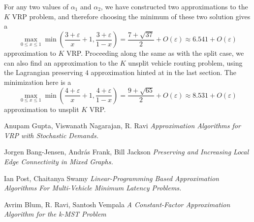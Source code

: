\documentclass{article}
\theoremstyle{plain}
\theoremstyle{plain}
\begin{document}
For any two values of $\alpha_1$ and $\alpha_2$, we have constructed two approximations to the $K$ VRP problem, and therefore choosing the minimum of these two solution gives a
%
\[ \max_{0 \leq x \leq 1} \min \left( \frac{3 + \varepsilon}{x} + 1, \frac{3 + \varepsilon}{1 - x} \right) = \frac{7 + \sqrt{37}}{2} + O(\varepsilon) \approx 6.541 + O(\varepsilon) \]
%
approximation to $K$ VRP. Proceeding along the same as with the split case, we can also find an approximation to the $K$ unsplit vehicle routing problem, using the Lagrangian preserving $4$ approximation hinted at in the last section. The minimization here is a
%
\[ \max_{0 \leq x \leq 1} \min \left( \frac{4 + \varepsilon}{x} + 1, \frac{4 + \varepsilon}{1 - x} \right) = \frac{9 + \sqrt{65}}{2} + O(\varepsilon) \approx 8.531 + O(\varepsilon) \]
%
approximation to unsplit $K$ VRP.

\begin{thebibliography}{9}

Anupam Gupta, Viswanath Nagarajan, R. Ravi
\textit{Approximation Algorithms for VRP with Stochastic Demands.}

Jorgen Bang-Jensen, Andr\'{a}s Frank, Bill Jackson
\textit{Preserving and Increasing Local Edge Connectivity in Mixed Graphs.}

Ian Post, Chaitanya Swamy
\textit{Linear-Programming Based Approximation Algorithms For Multi-Vehicle Minimum Latency Problems.}

Avrim Blum, R. Ravi, Santosh Vempala
\textit{A Constant-Factor Approximation Algorithm for the k-MST Problem}

\end{thebibliography}
\end{document}
